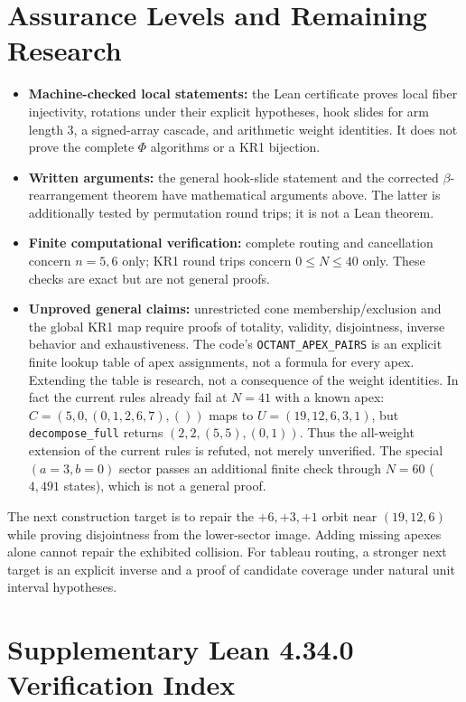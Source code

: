 \documentclass[11pt]{article}
\theoremstyle{definition}
\begin{document}
\section{Assurance Levels and Remaining Research}
\begin{itemize}
\item \textbf{Machine-checked local statements:} the Lean certificate proves local fiber injectivity, rotations under their explicit hypotheses, hook slides for arm length $3$, a signed-array cascade, and arithmetic weight identities. It does not prove the complete $\Phi$ algorithms or a KR1 bijection.
\item \textbf{Written arguments:} the general hook-slide statement and the corrected $\beta$-rearrangement theorem have mathematical arguments above. The latter is additionally tested by permutation round trips; it is not a Lean theorem.
\item \textbf{Finite computational verification:} complete routing and cancellation concern $n=5,6$ only; KR1 round trips concern $0\le N\le40$ only. These checks are exact but are not general proofs.
\item \textbf{Unproved general claims:} unrestricted cone membership/exclusion and the global KR1 map require proofs of totality, validity, disjointness, inverse behavior and exhaustiveness. The code's \texttt{OCTANT\_APEX\_PAIRS} is an explicit finite lookup table of apex assignments, not a formula for every apex. Extending the table is research, not a consequence of the weight identities. In fact the current rules already fail at $N=41$ with a known apex: $C=(5,0,(0,1,2,6,7),())$ maps to $U=(19,12,6,3,1)$, but \texttt{decompose\_full} returns $(2,2,(5,5),(0,1))$. Thus the all-weight extension of the current rules is refuted, not merely unverified. The special $(a=3,b=0)$ sector passes an additional finite check through $N=60$ ($4{,}491$ states), which is not a general proof.
\end{itemize}
The next construction target is to repair the $+6,+3,+1$ orbit near $(19,12,6)$ while proving disjointness from the lower-sector image. Adding missing apexes alone cannot repair the exhibited collision. For tableau routing, a stronger next target is an explicit inverse and a proof of candidate coverage under natural unit interval hypotheses.

\section{Supplementary Lean 4.34.0 Verification Index}
\end{document}
